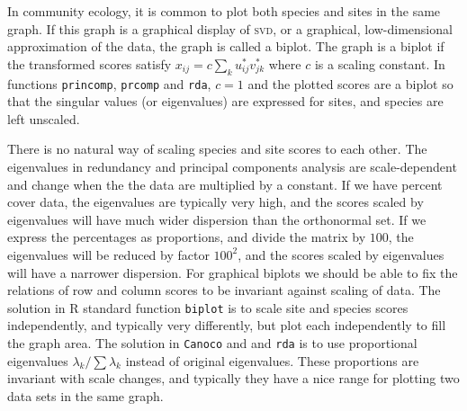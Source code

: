 \documentclass[a4paper,10pt]{amsart}
\begin{document}
In community ecology, it is common to plot both species and sites in
the same graph.  If this graph is a graphical display of \textsc{svd},
or a graphical, low-dimensional approximation of the data, the graph
is called a biplot.  The graph is a biplot if the transformed scores
satisfy $x_{ij} = c \sum_k u_{ij}^* v_{jk}^*$ where $c$ is a scaling
constant.  In functions \texttt{princomp}, \texttt{prcomp} and
\texttt{rda}, $c=1$ and the plotted scores are a biplot so that the
singular values (or eigenvalues) are expressed for sites, and species
are left unscaled.  

There is no natural way of scaling species and site scores to each
other.  The eigenvalues in redundancy and principal components
analysis are scale-dependent and change when the the data are
multiplied by a constant.  If we have percent cover data, the
eigenvalues are typically very high, and the scores scaled by
eigenvalues will have much wider dispersion than the orthonormal set.
If we express the percentages as proportions, and divide the matrix by
$100$, the eigenvalues will be reduced by factor $100^2$, and the
scores scaled by eigenvalues will have a narrower dispersion.  For
graphical biplots we should be able to fix the relations of row and
column scores to be invariant against scaling of data.  The solution
in R standard function \texttt{biplot} is to scale site and species
scores independently, and typically very differently, but plot each
independently to fill the graph area.  The solution in \texttt{Canoco} and 
and \texttt{rda} is to use proportional eigenvalues $\lambda_k / \sum
\lambda_k$ instead of original eigenvalues.  These proportions are
invariant with scale changes, and typically they have a nice range for
plotting two data sets in the same graph.
\end{document}
